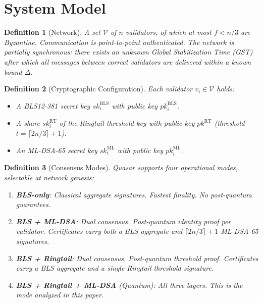 \documentclass[11pt,a4paper]{article}
\newtheorem{definition}{Definition}[section]
\begin{document}
\section{System Model}
\label{sec:model}

\begin{definition}[Network]
A set $\mathcal{V}$ of $n$ validators, of which at most $f < n/3$ are
Byzantine. Communication is point-to-point authenticated. The network is
partially synchronous: there exists an unknown Global Stabilization Time
(GST) after which all messages between correct validators are delivered within
a known bound $\Delta$.
\end{definition}

\begin{definition}[Cryptographic Configuration]
Each validator $v_i \in \mathcal{V}$ holds:
\begin{itemize}[leftmargin=2em]
\item A BLS12-381 secret key $\mathit{sk}_i^{\mathrm{BLS}}$ with public key
      $\mathit{pk}_i^{\mathrm{BLS}}$.
\item A share $\mathit{sk}_i^{\mathrm{RT}}$ of the Ringtail threshold key
      with public key $\mathit{pk}^{\mathrm{RT}}$ (threshold $t = \lceil 2n/3
      \rceil + 1$).
\item An ML-DSA-65 secret key $\mathit{sk}_i^{\mathrm{ML}}$ with public key
      $\mathit{pk}_i^{\mathrm{ML}}$.
\end{itemize}
\end{definition}

\begin{definition}[Consensus Modes]
\label{def:modes}
Quasar supports four operational modes, selectable at network genesis:
\begin{enumerate}[leftmargin=2em]
\item \textbf{BLS-only}: Classical aggregate signatures. Fastest finality.
      No post-quantum guarantees.
\item \textbf{BLS + ML-DSA}: Dual consensus. Post-quantum identity proof per
      validator. Certificates carry both a BLS aggregate and $\lceil 2n/3
      \rceil + 1$ ML-DSA-65 signatures.
\item \textbf{BLS + Ringtail}: Dual consensus. Post-quantum threshold proof.
      Certificates carry a BLS aggregate and a single Ringtail threshold
      signature.
\item \textbf{BLS + Ringtail + ML-DSA} (Quantum): All three layers. This is
      the mode analyzed in this paper.
\end{enumerate}
\end{definition}
\end{document}
